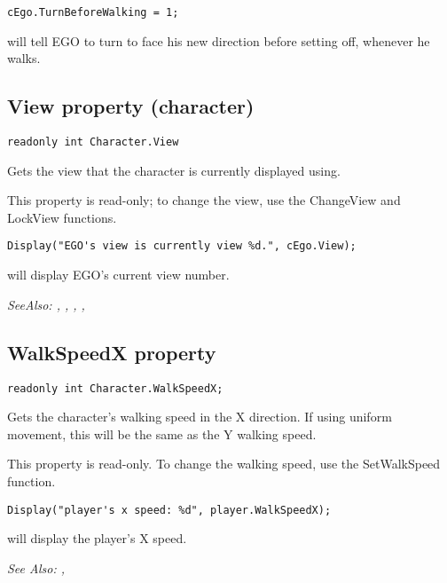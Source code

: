 \begin{verbatim}
cEgo.TurnBeforeWalking = 1;
\end{verbatim}
will tell EGO to turn to face his new direction before setting off, whenever he walks.


\subsection{View property (character)}\label{Character.View}%

\begin{verbatim}
readonly int Character.View
\end{verbatim}
Gets the view that the character is currently displayed using.

This property is read-only; to change the view, use the ChangeView and LockView functions.

\begin{verbatim}
Display("EGO's view is currently view %d.", cEgo.View);
\end{verbatim}
will display EGO's current view number.

\it{SeeAlso:} ,
,
,
,


\subsection{WalkSpeedX property}\label{Character.WalkSpeedX}%

\begin{verbatim}
readonly int Character.WalkSpeedX;
\end{verbatim}

Gets the character's walking speed in the X direction. If using uniform movement,
this will be the same as the Y walking speed.

This property is read-only. To change the walking speed, use the SetWalkSpeed function.

\begin{verbatim}
Display("player's x speed: %d", player.WalkSpeedX);
\end{verbatim}
will display the player's X speed.

\it{See Also:} ,


